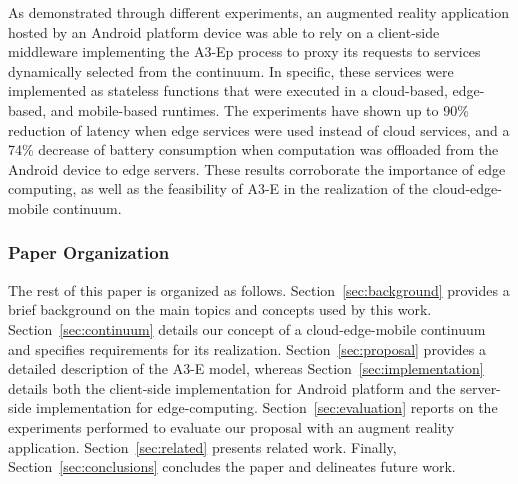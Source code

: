



As demonstrated through different experiments, an augmented reality application hosted by an Android platform device was able to rely on a client-side middleware implementing the A3-Ep process to proxy its requests to services dynamically selected from the continuum. In specific, these services were implemented as stateless functions that were executed in a cloud-based, edge-based, and mobile-based runtimes. The experiments have shown up to 90\% reduction of latency when edge services were used instead of cloud services, and a 74\% decrease of battery consumption when computation was offloaded from the Android device to edge servers. These results corroborate the importance of edge computing, as well as the feasibility of A3-E in the realization of the cloud-edge-mobile continuum.




\subsubsection*{Paper Organization}

The rest of this paper is organized as follows. 
Section~\ref{sec:background} provides a brief background on the main topics and concepts used by this work. Section~\ref{sec:continuum} details our concept of a cloud-edge-mobile continuum and specifies requirements for its realization. Section~\ref{sec:proposal} provides a detailed description of the A3-E model, whereas Section~\ref{sec:implementation} details both the client-side implementation for Android platform and the server-side implementation for edge-computing. Section~\ref{sec:evaluation} reports on the experiments performed to evaluate our proposal with an augment reality application. Section~\ref{sec:related} presents related work. Finally, Section~\ref{sec:conclusions} concludes the paper and delineates future work.




